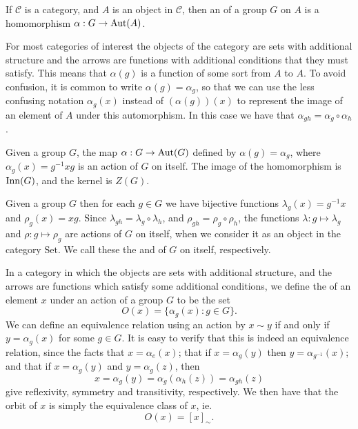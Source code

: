\begin{definition}
  If $\mathcal{C}$ is a category, and $A$ is an object in $\mathcal{C}$,
  then an  of a group $G$ on $A$ is a homomorphism
  $\alpha: G \to \operatorname{Aut}(A)$.
\end{definition}

For most categories of interest the objects of the category are
sets with additional structure and the arrows are functions with additional
conditions that they must satisfy. This means that $\alpha(g)$ is a
function of some sort from $A$ to $A$.  To avoid confusion, it is common to
write $\alpha(g) = \alpha_{g}$, so that we can use the less confusing
notation $\alpha_{g}(x)$ instead of $(\alpha(g))(x)$ to represent the image
of an element of $A$ under this automorphism.  In this case we have that
$\alpha_{gh} = \alpha_{g} \circ \alpha_{h}$.

\begin{example}\label{eg:inneraction}
  Given a group $G$, the map $\alpha: G \to \operatorname{Aut}(G)$ defined by $\alpha(g) =
  \alpha_{g}$, where $\alpha_{g}(x) = g^{-1}xg$ is an action of $G$ on
  itself.  The image of the homomorphism is $\operatorname{Inn}(G)$, and the kernel is
  $Z(G)$.
\end{example}

\begin{example}
  Given a group $G$ then for each $g \in G$ we have bijective functions
  $\lambda_{g}(x) = g^{-1}x$ and $\rho_{g}(x) = xg$.  Since $\lambda_{gh} =
  \lambda_{g} \circ \lambda_{h}$, and $\rho_{gh} = \rho_{g} \circ \rho_{h}$,
  the functions $\lambda: g \mapsto \lambda_{g}$ and $\rho: g \mapsto
  \rho_{g}$ are actions of $G$ on itself, when we consider it as an object
  in the category $\mathrm{Set}$.  We call these the
   and  of $G$ on
  itself, respectively.
\end{example}

In a category in which the objects are sets with additional structure, and the
arrows are functions which satisfy some additional conditions, we define the
 of an element $x$ under an action of a group $G$ to be
the set
\[
  O(x) = \{ \alpha_{g}(x) : g \in G\}.
\]
We can define an equivalence relation using an action by $x \sim y$ if and
only if $y = \alpha_{g}(x)$ for some $g \in G$.  It is easy to verify that
this is indeed an equivalence relation, since the facts that $x =
\alpha_{e}(x)$; that if $x = \alpha_{g}(y)$ then $y = \alpha_{g^{-1}}(x)$; and
that if $x = \alpha_{g}(y)$ and $y = \alpha_{g}(z)$, then
\[
  x = \alpha_{g}(y) = \alpha_{g}(\alpha_{h}(z)) = \alpha_{gh}(z)
\]
give reflexivity, symmetry and transitivity, respectively.  We then have
that the orbit of $x$ is simply the equivalence class of $x$, ie.
\[
  O(x) = [x]_{\sim}.
\]

